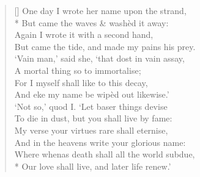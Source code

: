\documentclass[MAIN]{subfiles}
\begin{document}
\settowidth{\versewidth}{`Vain man,' said she, `that dost in vain assay,}
\begin{verse}[\versewidth]
One day I wrote her name upon the strand,\\*
\vin But came the waves \& wash\`ed it away:\\
Again I wrote it with a second hand,\\
\vin But came the tide, and made my pains his prey.\\
\vin `Vain man,' said she, `that dost in vain assay,\\
\vin \vin A mortal thing so to immortalise;\\
\vin For I myself shall like to this decay,\\
\vin \vin And eke my name be wip\`ed out likewise.'\\
`Not so,' quod I. `Let baser things devise\\
\vin To die in dust, but you shall live by fame:\\
My verse your virtues rare shall eternise,\\
\vin And in the heavens write your glorious name:\\
Where whenas death shall all the world subdue,\\*
Our love shall live, and later life renew.'
\end{verse}
\end{document}
